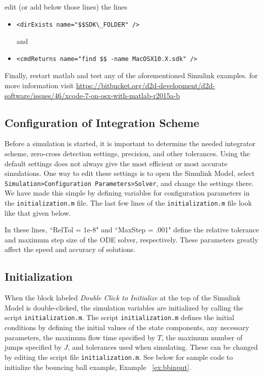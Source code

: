 \documentclass{article}
\begin{document}
\begin{itemize}
edit (or add below those lines) the lines
\begin{itemize}
\item
\begin{verbatim}
<dirExists name="$$SDK\_FOLDER" />
\end{verbatim}
and
\item
\begin{verbatim}
<cmdReturns name="find $$ -name MacOSX10.X.sdk" />
\end{verbatim}
\end{itemize}

Finally, restart matlab and test any of the aforementioned Simulink examples.
for more information visit {\footnotesize\url{https://bitbucket.org/d2d-development/d2d-software/issues/46/xcode-7-on-osx-with-matlab-r2015a-b}}

\end{itemize}

    
\subsection{Configuration of Integration Scheme}
Before a simulation is started, it is important to determine the needed integrator scheme, zero-cross detection settings, precision, and other tolerances. Using the default settings does not always give the most efficient or most accurate simulations. One way to edit these settings is to open the Simulink Model, select {\tt Simulation>Configuration Parameters>Solver}, and change the settings there. We have made this simple by defining variables for configuration parameters in the {\tt initialization.m} file. The last few lines of the {\tt initialization.m} file look like that given below.\\

\label{scr:config_inst}


In these lines, ``RelTol = 1e-8" and ``MaxStep = .001" define the relative tolerance  and maximum step size of the ODE solver, respectively. These parameters greatly affect the speed and accuracy of solutions.

\subsection{Initialization}

When the block labeled {\em Double Click to Initialize} at the top of the Simulink Model is double-clicked, the simulation variables are initialized by calling the script {\tt initialization.m}. The script {\tt initialization.m} defines the initial conditions by defining the initial values of the state components, any necessary parameters, the maximum flow time specified by $T$, the maximum number of jumps specified by $J$, and tolerances used when simulating. These can be changed by editing the script file {\tt initialization.m}. See below for sample code to initialize the bouncing ball example, Example ~\ref{ex:bbinput}.\\
\end{document}
